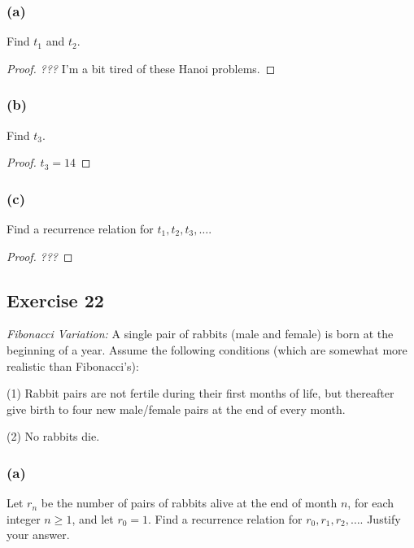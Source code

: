 \documentclass[14pt]{extarticle}
\begin{document}
\subsubsection{(a)}
Find $t_1$ and $t_2$.

\begin{proof}
    {\it ???} I'm a bit tired of these Hanoi problems.
\end{proof}

\subsubsection{(b)}
Find $t_3$.

\begin{proof}
    $t_3 = 14$
\end{proof}

\subsubsection{(c)}
Find a recurrence relation for $t_1, t_2, t_3, \ldots$.

\begin{proof}
    {\it ???}
\end{proof}

\subsection{Exercise 22}
{\it Fibonacci Variation:} A single pair of rabbits (male and female) is born at the beginning of a year.
Assume the following conditions (which are somewhat more realistic than Fibonacci’s):

(1) Rabbit pairs are not fertile during their first months of life, but thereafter give birth to four new male/female
pairs at the end of every month.

(2) No rabbits die.

\subsubsection{(a)}
Let $r_n$ be the number of pairs of rabbits alive at the end of month $n$, for each integer $n \geq 1$, and let
$r_0 = 1$. Find a recurrence relation for $r_0, r_1, r_2, \ldots$. Justify your answer.
\end{document}
